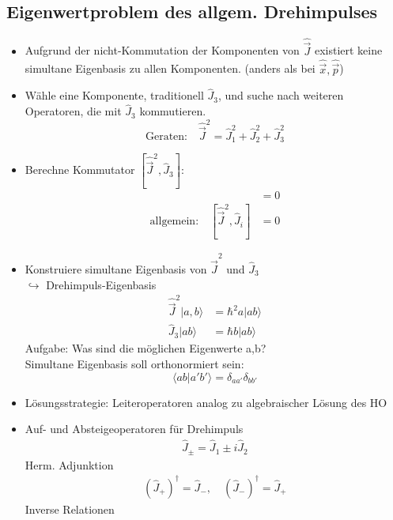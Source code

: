 \documentclass[10pt,article,colorback,accentcolor=tud9d]{scrartcl}
\begin{document}
\subsection{Eigenwertproblem des allgem. Drehimpulses}
\begin{itemize}
	\item Aufgrund der nicht-Kommutation der Komponenten von $\hat{\vec{J}}$ existiert keine simultane Eigenbasis zu allen Komponenten. (anders als bei $\hat{\vec{x}},\hat{\vec{p}}$)
  \item Wähle eine Komponente, traditionell $\hat{J}_3$, und suche nach weiteren Operatoren, die mit $\hat{J}_3$ kommutieren.
    \begin{equation}
    \text{Geraten:}\quad \hat{\vec{J}}^2=\hat{J}_1^2+\hat{J}_2^2+\hat{J}_3^2
    \end{equation}
  \item Berechne Kommutator $[\hat{\vec{J}}^2,\hat{J}_3]$:
    \begin{align}
    [\hat{\vec{J}}^2,\hat{J}_3]&=0\\
    \text{allgemein:}\quad  [\hat{\vec{J}}^2,\hat{J}_i]&=0
    \end{align}
  \item Konstruiere simultane Eigenbasis von $\hat{\vec{J}}^2$ und $\hat{J}_3$\\
    $\hookrightarrow$ Drehimpuls-Eigenbasis
    \begin{align}
    \hat{\vec{J}}^2|a,b\rangle&=\hbar^2a|ab\rangle\\
    \hat{J}_3|ab\rangle&=\hbar b|ab\rangle
    \end{align}
    Aufgabe: Was sind die möglichen Eigenwerte a,b?\\
    Simultane Eigenbasis soll orthonormiert sein:
    \begin{equation}
    \langle ab|a'b'\rangle=\delta_{aa'}\delta_{bb'}
    \end{equation}
  \item Lösungsstrategie: Leiteroperatoren analog zu algebraischer Lösung des HO
  \item Auf- und Absteigeoperatoren für Drehimpuls
    \begin{align}
    \hat{J}_\pm=\hat{J}_1\pm i\hat{J}_2
    \end{align}
    Herm. Adjunktion
    \begin{align}
    (\hat{J}_+)^\dagger=\hat{J}_-,\quad (\hat{J}_-)^\dagger=\hat{J}_+
    \end{align}
    Inverse Relationen
    \begin{align}

\end{align}
\end{itemize}
\end{document}
